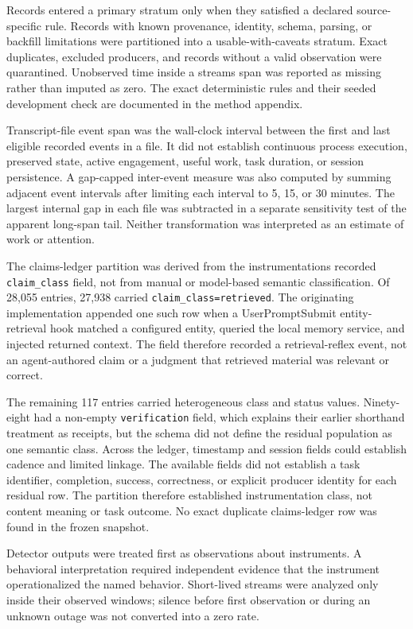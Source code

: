 \documentclass[12pt]{article}
\begin{document}
Records entered a primary stratum only when they satisfied a declared source-specific rule. Records with known provenance, identity, schema, parsing, or backfill limitations were partitioned into a usable-with-caveats stratum. Exact duplicates, excluded producers, and records without a valid observation were quarantined. Unobserved time inside a stream\textquotesingle s span was reported as missing rather than imputed as zero. The exact deterministic rules and their seeded development check are documented in the method appendix.

Transcript-file event span was the wall-clock interval between the first and last eligible recorded events in a file. It did not establish continuous process execution, preserved state, active engagement, useful work, task duration, or session persistence. A gap-capped inter-event measure was also computed by summing adjacent event intervals after limiting each interval to 5, 15, or 30 minutes. The largest internal gap in each file was subtracted in a separate sensitivity test of the apparent long-span tail. Neither transformation was interpreted as an estimate of work or attention.

The claims-ledger partition was derived from the instrumentation\textquotesingle s recorded \texttt{claim\_class} field, not from manual or model-based semantic classification. Of 28,055 entries, 27,938 carried \texttt{claim\_\allowbreak class=\allowbreak retrieved}. The originating implementation appended one such row when a UserPromptSubmit entity-retrieval hook matched a configured entity, queried the local memory service, and injected returned context. The field therefore recorded a retrieval-reflex event, not an agent-authored claim or a judgment that retrieved material was relevant or correct.

The remaining 117 entries carried heterogeneous class and status values. Ninety-eight had a non-empty \texttt{verification} field, which explains their earlier shorthand treatment as receipts, but the schema did not define the residual population as one semantic class. Across the ledger, timestamp and session fields could establish cadence and limited linkage. The available fields did not establish a task identifier, completion, success, correctness, or explicit producer identity for each residual row. The partition therefore established instrumentation class, not content meaning or task outcome. No exact duplicate claims-ledger row was found in the frozen snapshot.

Detector outputs were treated first as observations about instruments. A behavioral interpretation required independent evidence that the instrument operationalized the named behavior. Short-lived streams were analyzed only inside their observed windows; silence before first observation or during an unknown outage was not converted into a zero rate.
\end{document}
